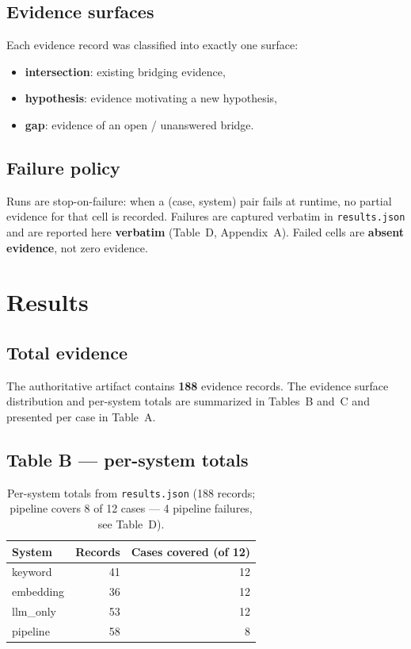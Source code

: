 \documentclass[11pt]{article}
\begin{document}
\subsection{Evidence surfaces}
Each evidence record was classified into exactly one surface:
\begin{itemize}
    \item \textbf{intersection}: existing bridging evidence,
    \item \textbf{hypothesis}: evidence motivating a new hypothesis,
    \item \textbf{gap}: evidence of an open / unanswered bridge.
\end{itemize}

\subsection{Failure policy}
Runs are stop-on-failure: when a (case, system) pair fails at runtime, no
partial evidence for that cell is recorded. Failures are captured verbatim in
\texttt{results.json} and are reported here \textbf{verbatim} (Table~D,
Appendix~A). Failed cells are \textbf{absent evidence}, not zero evidence.

\section{Results}
\label{sec:results}

\subsection{Total evidence}
The authoritative artifact contains \textbf{188} evidence records. The evidence
surface distribution and per-system totals are summarized in Tables~B and~C and
presented per case in Table~A.

\subsection{Table B --- per-system totals}
\begin{table}[h]
\centering
\begin{tabular}{lrr}
\toprule
\textbf{System} & \textbf{Records} & \textbf{Cases covered (of 12)} \\
\midrule
keyword   & 41 & 12 \\
embedding & 36 & 12 \\
llm\_only & 53 & 12 \\
pipeline  & 58 & 8 \\
\bottomrule
\end{tabular}
\caption{Per-system totals from \texttt{results.json} (188 records; pipeline
covers 8 of 12 cases --- 4 pipeline failures, see Table~D).}
\label{tab:b}
\end{table}
\end{document}
